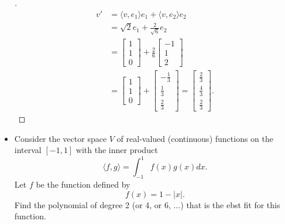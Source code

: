 \documentclass[11pt]{article}
\begin{document}
\begin{itemize}
\begin{proof}[\unskip\nopunct]
            \begin{align*}
                v' &= \langle v,e_1 \rangle e_1 + \langle v, e_2 \rangle e_2 \\
                   &= \sqrt{2} e_1 + \frac{2}{\sqrt{6}} e_2 \\
                   &= \begin{bmatrix}
                       1 \\ 1 \\ 0
                   \end{bmatrix} + \frac{2}{6} \begin{bmatrix}
                       -1 \\ 1 \\ 2
                   \end{bmatrix} \\
                   &= \begin{bmatrix}
                       1 \\ 1 \\ 0
                   \end{bmatrix} + \begin{bmatrix}
                       - \frac{1}{3} \\ \frac{1}{3} \\ \frac{2}{3}
                   \end{bmatrix} = \begin{bmatrix}
                       \frac{2}{3} \\ \frac{4}{3} \\ \frac{2}{3}
                   \end{bmatrix}.
            \end{align*}
        \end{proof}

        \item Consider the vector space $V$ of real-valued (continuous) functions on the interval \([-1,1]\) with the inner product \[\langle f,g \rangle = \int_{-1}^{1} f(x) g(x) dx.\] Let $f$ be the function defined by \[f(x) = 1 - |x|.\] Find the polynomial of degree 2 (or 4, or 6, \(\dots\)) that is the ebst fit for this function.
        

\end{itemize}
\end{document}
